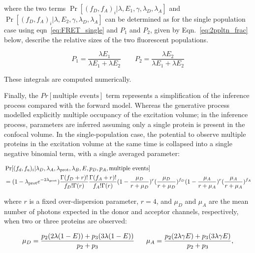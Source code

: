 where the two terms $\Pr[(f_D, f_A)_i | \lambda, E_1, \gamma, \lambda_{D}, \lambda_{A}]$ and $\Pr[(f_D, f_A)_i | \lambda, E_2, \gamma, \lambda_{D}, \lambda_{A}]$ can be determined as for the single population case using eqn~\ref{eq:FRET_single} and $P_1$ and $P_2$, given by Eqn.~\ref{eq:2ppltn_frac} below, describe the relative sizes of the two fluorescent populations.

\begin{equation}
P_1 = \frac{\lambda E_1}{\lambda E_1 + \lambda E_2} \qquad P_2 = \frac{\lambda E_2}{\lambda E_1 + \lambda E_2}
\label{eq:2ppltn_frac}
\end{equation}

These integrals are computed numerically.  

Finally, the $Pr[\text{multiple events}]$ term represents a simplification of the inference process compared with the forward model.  Whereas the generative process modelled explicitly multiple occupancy of the excitation volume; in the inference process, parameters are inferred assuming only a single protein is present in the confocal volume.  In the single-population case, the potential to observe multiple proteins in the excitation volume at the same time is collapsed into a single negative binomial term, with a single averaged parameter:

\begin{equation}
\begin{aligned}
\footnotesize
&\Pr[(f_d, f_a)_i|\lambda_D, \lambda_A, \lambda_{\text{prot}}, \lambda_B, E, p_D, p_A, \text{multiple events}] \\ 
&= (1-\lambda_{\text{prot}} e^{-2\lambda_{\text{prot}}})\frac{\Gamma(f_D+r)!}{f_D!\Gamma(r)}\frac{\Gamma(f_A+r)!}{f_A!\Gamma(r)}(1-\frac{\mu_D}{r+\mu_D})^r(\frac{\mu_D}{r+\mu_D})^{f_D}(1-\frac{\mu_A}{r+\mu_A})^r(\frac{\mu_A}{r+\mu_A})^{f_A}
\label{eq:multippltn} 
\end{aligned}
\end{equation}

where $r$ is a fixed over-dispersion parameter, $r = 4$, and $\mu_D$ and $\mu_A$ are the mean number of photons expected in the donor and acceptor channels, respectively, when two or three proteins are observed:

\begin{equation}
\footnotesize
\mu_D = \frac{p_2(2\lambda(1-E)) +p_3(3\lambda(1-E))}{p_2+p_3} \qquad
\mu_A = \frac{p_2(2\lambda \gamma E) +p_3(3\lambda \gamma E)}{p_2+p_3} ,
\end{equation}


